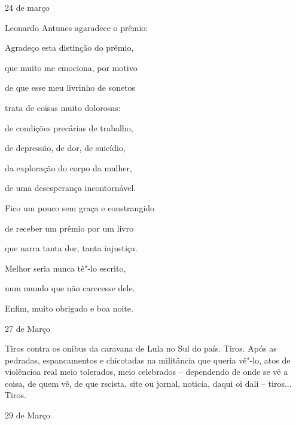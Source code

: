 \begin{flushright}
24 de março
\end{flushright}

Leonardo Antunes agaradece o prêmio:

Agradeço esta distinção do prêmio,

que muito me emociona, por motivo

de que esse meu livrinho de sonetos

trata de coisas muito dolorosas:

de condições precárias de trabalho,

de depressão, de dor, de suicídio,

da exploração do corpo da mulher,

de uma desesperança incontornável.

Fico um pouco sem graça e constrangido

de receber um prêmio por um livro

que narra tanta dor, tanta injustiça.

Melhor seria nunca tê"-lo escrito,

num mundo que não carecesse dele.

Enfim, muito obrigado e boa noite.

\begin{flushright}
27 de Março
\end{flushright}

Tiros contra os onibus da caravana de Lula no Sul do país. Tiros. Após
as pedradas, espancamentos e chicotadas na militância que queria vê"-lo,
atos de violêncioa real meio tolerados, meio celebrados -- dependendo de
onde se vê a coisa, de quem vê, de que rscista, site ou jornal, noticia,
daqui oi dali -- tiros... Tiros.

\begin{flushright}
29 de Março
\end{flushright}

